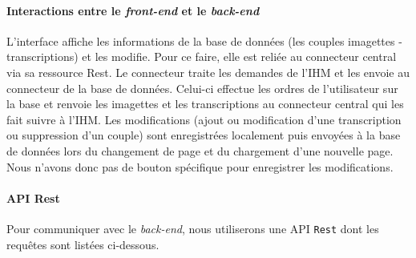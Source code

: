 \paragraph{Interactions entre le \textit{front-end} et le \textit{back-end}}

L’interface affiche les informations de la base de données (les couples imagettes - transcriptions) et les modifie. Pour ce faire, elle est reliée au connecteur central via sa ressource Rest. Le connecteur traite les demandes de l’IHM et les envoie au connecteur de la base de données. Celui-ci effectue les ordres de l’utilisateur sur la base et renvoie les imagettes et les transcriptions au connecteur central qui les fait suivre à l’IHM. Les modifications (ajout ou modification d’une transcription ou suppression d’un couple) sont enregistrées localement puis envoyées à la base de données lors du changement de page et du chargement d'une nouvelle page. Nous n'avons donc pas de bouton spécifique pour enregistrer les modifications.

\newpage{}

\paragraph{API Rest}
Pour communiquer avec le \textit{back-end}, nous utiliserons une API \texttt{Rest} dont les requêtes sont listées ci-dessous.
\newline{}

